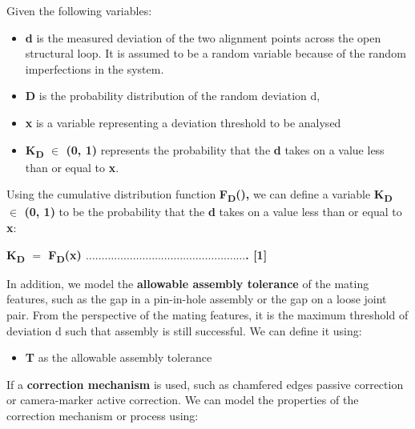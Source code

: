 \documentclass[11pt]{book}
\begin{document}
Given the following variables: 

\begin{itemize}
	\item \textbf{d }is the measured deviation of the two alignment points across the open structural loop. It is assumed to be a random variable because of the random imperfections in the system. 

	\item \textbf{D} is the probability distribution of the random deviation d, 

	\item \textbf{x} is a variable representing a deviation threshold to be analysed 

	\item \textbf{K\textsubscript{D }$\in$ (0, 1) }represents the probability that the \textbf{d} takes on a value less than or equal to \textbf{x}. 

\end{itemize}
Using the cumulative distribution function \textbf{F\textsubscript{D}(),} we can define a variable \textbf{K\textsubscript{D }$\in$ (0, 1) }to be the probability that the \textbf{d} takes on a value less than or equal to \textbf{x}: 

\textbf{K\textsubscript{D} $=$ F\textsubscript{D}(x) $\ldots$$\ldots$$\ldots$$\ldots$$\ldots$$\ldots$$\ldots$$\ldots$$\ldots$$\ldots$$\ldots$$\ldots$$\ldots$$\ldots$$\ldots$$\ldots$$\ldots$. [1]}

In addition, we model the \textbf{allowable assembly tolerance} of the mating features, such as the gap in a pin-in-hole assembly or the gap on a loose joint pair. From the perspective of the mating features, it is the maximum threshold of deviation d such that assembly is still successful. We can define it using: 

\begin{itemize}
	\item \textbf{T }as the allowable assembly tolerance 

\end{itemize}
If a \textbf{correction mechanism} is used, such as chamfered edges passive correction or camera-marker active correction. We can model the properties of the correction mechanism or process using: 
\end{document}
